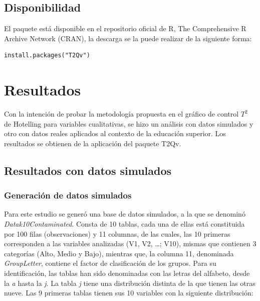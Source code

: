 \documentclass[mathematics,article,submit,moreauthors,pdftex]{mdpi}
\begin{document}
\hypertarget{disponibilidad}{%
\subsection{Disponibilidad}\label{disponibilidad}}

El paquete está disponible en el repositorio oficial de R, The
Comprehensive R Archive Network (CRAN), la descarga se la puede realizar
de la siguiente forma:

\begin{verbatim}
install.packages("T2Qv")
\end{verbatim}

\hypertarget{resultados}{%
\section{Resultados}\label{resultados}}

Con la intención de probar la metodología propuesta en el gráfico de
control \(T^2\) de Hotelling para variables cualitativas, se hizo un
análisis con datos simulados y otro con datos reales aplicados al
contexto de la educación superior. Los resultados se obtienen de la
aplicación del paquete T2Qv.

\hypertarget{resultados-con-datos-simulados}{%
\subsection{Resultados con datos
simulados}\label{resultados-con-datos-simulados}}

\hypertarget{generaciuxf3n-de-datos-simulados}{%
\subsubsection{Generación de datos
simulados}\label{generaciuxf3n-de-datos-simulados}}

\label{simulados}

Para este estudio se generó una base de datos simulados, a la que se
denominó \emph{Datak10Contaminated}. Consta de 10 tablas, cada una de
ellas está constituida por 100 filas (observaciones) y 11 columnas, de
las cuales, las 10 primeras corresponden a las variables analizadas (V1,
V2, \ldots; V10), mismas que contienen 3 categorías (Alto, Medio y
Bajo), mientras que, la columna 11, denominada \emph{GroupLetter},
contiene el factor de clasificación de los grupos. Para su
identificación, las tablas han sido denominadas con las letras del
alfabeto, desde la \emph{a} hasta la \emph{j}. La tabla \emph{j} tiene
una distribución distinta de la que tienen las otras nueve. Las 9
primeras tablas tienen sus 10 variables con la siguiente distribución:
\end{document}
